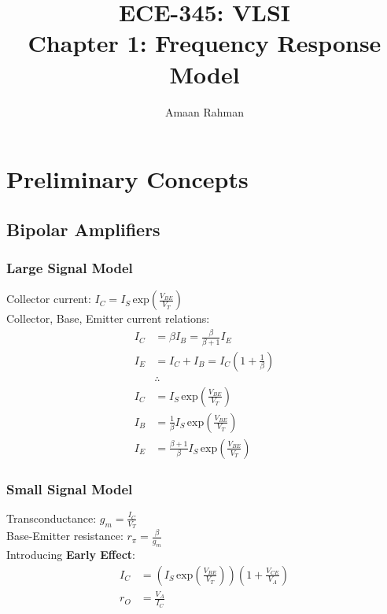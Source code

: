 \documentclass{article}
\title{
    ECE-345: VLSI \\ 
    Chapter 1: Frequency Response Model
}
\author{Amaan Rahman}
\begin{document}
\maketitle
\section{Preliminary Concepts}
\subsection{Bipolar Amplifiers}
\subsubsection{Large Signal Model}
Collector current: $I_C = I_S\,\text{exp}\left(\frac{V_{BE}}{V_T}\right)$ \\
Collector, Base, Emitter current relations: 
\begin{equation*}
    \begin{split}
        I_C &= \beta I_B = \frac{\beta}{\beta + 1}I_E\\
        I_E &= I_C + I_B = I_C\left(1 + \frac{1}{\beta}\right) \\
        &\therefore \\
        I_C &= I_S\,\text{exp}\left(\frac{V_{BE}}{V_T}\right) \\
        I_B &= \frac{1}{\beta}I_S\,\text{exp}\left(\frac{V_{BE}}{V_T}\right) \\
        I_E &= \frac{\beta + 1}{\beta}I_S\,\text{exp}\left(\frac{V_{BE}}{V_T}\right)
    \end{split}
\end{equation*}

\subsubsection{Small Signal Model}
Transconductance: $g_m = \frac{I_C}{V_T}$ \\
Base-Emitter resistance: $r_{\pi} = \frac{\beta}{g_m}$ \\
Introducing \textbf{Early Effect}: 
\begin{equation*}
    \begin{split}
        I_C &= \left(I_S\,\text{exp}\left(\frac{V_{BE}}{V_T}\right)\right)\left(1 + \frac{V_{CE}}{V_A}\right) \\
        r_O &= \frac{V_A}{I_C}
    \end{split}
\end{equation*}
\end{document}
